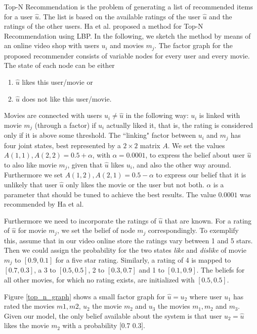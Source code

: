 Top-N Recommendation is the problem of generating a list of recommended items for a user $\hat u$. The list is based on the available ratings of the user $\hat u$ and the ratings of the other users. Ha et al. \cite{Ha:2012:TRT:2396761.2398636} proposed a method for Top-N Recommendation using LBP. In the following, we sketch the method by means of an online video shop with users $u_i$ and movies $m_j$. The factor graph for the proposed recommender consists of variable nodes for every user and every movie. The state of each node can be either
\begin{enumerate}
   \itemsep0em 
   \item $\hat u$ likes this user/movie or
   \item $\hat u$ does not like this user/movie.
\end{enumerate}
Movies are connected with users $u_i\neq \hat u$ in the following way: $u_i$ is linked with movie $m_j$ (through a factor) if $u_i$ actually liked it, that is, the rating is considered only if it is above some threshold. The ``linking" factor between $u_i$ and $m_j$ has four joint states, best represented by a $2\times 2$ matrix $A$. We set the values $A(1,1), A(2,2) = 0.5 + \alpha$, with $\alpha = 0.0001$, to express the belief about user $\hat u$ to also like movie $m_j$, given that $\hat u$ likes $u_i$, and also the other way around. Furthermore we set $A(1,2), A(2,1) = 0.5 - \alpha$ to express our belief that it is unlikely that user $\hat u$ only likes the movie or the user but not both. $\alpha$ is a parameter that should be tuned to achieve the best results. The value $0.0001$ was recommended by Ha et al.

Furthermore we need to incorporate the ratings of $\hat u$ that are known. For a rating of $\hat u$ for movie $m_j$, we set the belief of node $m_j$ correspondingly. To exemplify this, assume that in our video online store the ratings vary between 1 and 5 stars. Then we could assign the probability for the two states \textit{like} and \textit{dislike} of movie $m_j$ to $[0.9,0.1]$ for a five star rating. Similarly, a rating of 4 is mapped to $[0.7,0.3]$, a 3 to $[0.5,0.5]$, 2 to $[0.3,0.7]$ and 1 to $[0.1,0.9]$. The beliefs for all other movies, for which no rating exists, are initialized with $[0.5,0.5]$.

Figure \ref{top_n_graph} shows a small factor graph for  $\hat u = u_2$ where user $u_1$ has rated the movies $m1,m2$, $u_2$ the movie $m_2$ and $u_3$ the movies $m_1,m_2$ and $m_3$. Given our model, the only belief available about the system is that user $u_2 = \hat u$ likes the movie $m_2$ with a probability [0.7 0.3].

